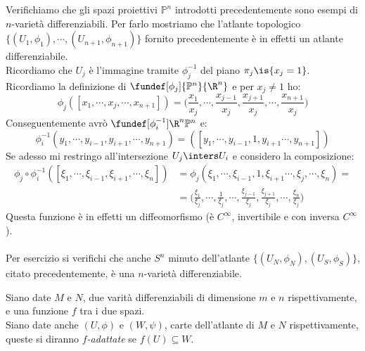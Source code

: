 

\begin{es}
Verifichiamo che gli spazi proiettivi $\mathbb{P}^n$ introdotti precedentemente sono esempi di $n$-varietà differenziabili. Per farlo mostriamo che l'atlante topologico $\{(U_1,\phi_1),\cdots,(U_{n+1},\phi_{n+1})\}$ fornito precedentemente è in effetti un atlante differenziabile.\\
Ricordiamo che $U_j$ è l'immagine tramite $\phi_j^{-1}$ del piano $\pi_{j}\is \{x_{j}=1 \}$.\\
Ricordiamo la definizione di $\fundef[\phi_j]{\mathbb{P}^n}{\R^n}$ e per $x_j \neq 1$ ho:
\begin{equation*}
\phi_j([x_1,\cdots,x_j,\cdots,x_{n+1}])=\Big (\frac{x_1}{x_j},\cdots,\frac{x_{j-1}}{x_j},\frac{x_{j+1}}{x_j},\cdots,\frac{x_{n+1}}{x_j} \Big )
\end{equation*}
Conseguentemente avrò $\fundef[\phi_i^{-1}]{\R^n}{\mathbb{P}^n}$ e:
\begin{equation*}
\phi_i^{-1}(y_1,\cdots,y_{i-1},y_{i+1},\cdots,y_{n+1})=([y_1,\cdots,y_{i-1},1,y_{i+1}\cdots,y_{n+1}])
\end{equation*}
Se adesso mi restringo all'intersezione $U_j \inters U_i$ e considero la composizione:
\begin{equation*}
\begin{split}
\phi_j \circ \phi_i^{-1}([\xi_1,\cdots,\xi_{i-1},\xi_{i+1},\cdots,\xi_n])& =\phi_j(\xi_1,\cdots,\xi_{i-1},1,\xi_{i+1}\cdots,\xi_j,\cdots,\xi_n)=\\
& =\Big (\frac{\xi_1}{\xi_j},\cdots,\frac{1}{\xi_j},\cdots,\frac{\xi_{j-1}}{\xi_j},\frac{\xi_{j+1}}{\xi_j},\cdots,\frac{\xi_n}{\xi_j}\Big )
\end{split}
\end{equation*}
Questa funzione è in effetti un diffeomorfismo (è $C^\infty$, invertibile e con inversa $C^\infty$).\\\\
Per esercizio si verifichi che anche $S^n$ minuto dell'atlante $\{(U_N,\phi_N),(U_S,\phi_S)\}$, citato precedentemente, è una $n$-varietà differenziabile.
\end{es}

\begin{defn}
Siano date $M$ e $N$, due varità differenziabili di dimensione $m$ e $n$ rispettivamente, e una funzione $f$ tra i due spazi. \\
Siano date anche $(U,\phi)$ e $(W,\psi)$, carte dell'atlante di $M$ e $N$ rispettivamente, queste si diranno \emph{$f$-adattate} se $f(U)\subseteq W.$
\end{defn}

